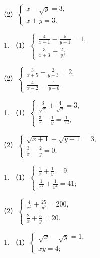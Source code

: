 （2）\(\left\{ \begin{array}{l} x - \sqrt{y} = 3, \\ x + y = 3. \end{array} \right.\)

\begin{enumerate}[start=3]
\item
  （1）\(\left\{ \begin{array}{l} \frac{4}{x - 1} - \frac{5}{y + 1} = 1, \\ \frac{3}{x + 3} = \frac{2}{y}; \end{array} \right.\)
\end{enumerate}

（2）\(\left\{ \begin{array}{l} \frac{3}{x + 5} + \frac{2}{y - 3} = 2, \\ \frac{4}{x - 2} = \frac{1}{y - 6}. \end{array} \right.\)

\begin{enumerate}[start=4]
\item
  （1）\(\left\{ \begin{array}{l} \frac{3}{\sqrt{x}} + \frac{4}{\sqrt{y}} = 3, \\ \frac{3}{x} - \frac{1}{y} = \frac{1}{12}, \end{array} \right.\)
\end{enumerate}

（2）\(\left\{ \begin{array}{l} \sqrt{x + 1} + \sqrt{y - 1} = 3, \\ \frac{3}{x} - \frac{2}{y} = 0, \end{array} \right.\)

\begin{enumerate}[start=5]
\item
  （1）\(\left\{ \begin{array}{l} \frac{1}{x} + \frac{1}{y} = 9, \\ \frac{1}{x^2} + \frac{1}{y^2} = 41; \end{array} \right.\)
\end{enumerate}

（2）\(\left\{ \begin{array}{l} \frac{4}{x^2} + \frac{25}{y^2} = 200, \\ \frac{2}{x} + \frac{5}{y} = 20. \end{array} \right.\)

\begin{enumerate}[start=6]
\item
  （1）\(\left\{ \begin{array}{l} \sqrt{x} - \sqrt{y} = 1, \\ xy = 4; \end{array} \right.\)
\end{enumerate}

